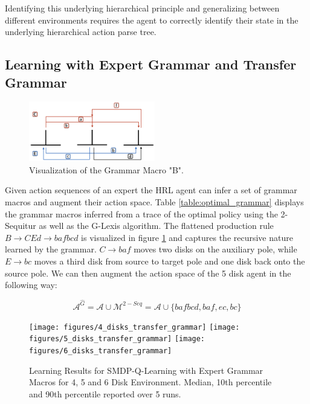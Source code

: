 \documentclass[colorinlistoftodos]{article}
\theoremstyle{definition}
\begin{document}
Identifying this underlying hierarchical principle and generalizing between different environments requires the agent to correctly identify their state in the underlying hierarchical action parse tree.
\subsection{Learning with Expert Grammar and Transfer Grammar}


\begin{figure}
  \begin{center}
    \includegraphics[width=0.49\textwidth]{figures/grammar_macro_viz}
  \end{center}
  \caption{Visualization of the Grammar Macro "B".}
  \label{fig:grammar_macro}
\end{figure}

Given action sequences of an expert the HRL agent can infer a set of grammar macros and augment their action space. Table \ref{table:optimal_grammar} displays the grammar macros inferred from a trace of the optimal policy using the 2-Sequitur as well as the G-Lexis algorithm. The flattened production rule $B \to CEd \to bafbcd$ is visualized in figure \ref{fig:grammar_macro} and captures the recursive nature learned by the grammar. $C \to baf$ moves two disks on the auxiliary pole, while $E \to bc$ moves a third disk from source to target pole and one disk back onto the source pole. We can then augment the action space of the 5 disk agent in the following way:

$$\mathcal{A}^{\hat{G}} = \mathcal{A} \cup \mathcal{M}^{2-Seq} = \mathcal{A} \cup \{bafbcd, baf, ec, bc\}$$

\begin{figure}[H]
  \texttt{[image: figures/4\_disks\_transfer\_grammar]}
\endminipage\hfill
{}
  \texttt{[image: figures/5\_disks\_transfer\_grammar]}
\endminipage\hfill
{}%
  \texttt{[image: figures/6\_disks\_transfer\_grammar]}
\endminipage
\caption{Learning Results for SMDP-Q-Learning with Expert Grammar Macros for 4, 5 and 6 Disk Environment. Median, 10th percentile and 90th percentile reported over 5 runs.}
\label{fig:expert_grammar}
\end{figure}
\end{document}
